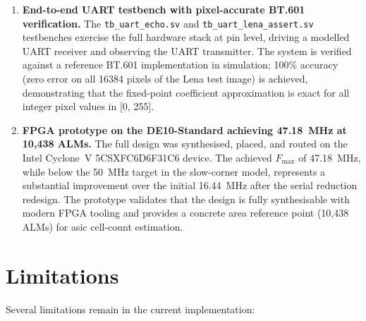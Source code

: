 \begin{enumerate}[label=\arabic*.]
  \item \textbf{End-to-end UART testbench with pixel-accurate BT.601 verification.}
    The \texttt{tb\_uart\_echo.sv} and \texttt{tb\_uart\_lena\_assert.sv} testbenches
    exercise the full hardware stack at pin level, driving a modelled UART receiver and
    observing the UART transmitter. The system is verified against a reference BT.601
    implementation in simulation; 100\% accuracy (zero error on all 16384 pixels of
    the Lena test image) is achieved, demonstrating that the fixed-point coefficient
    approximation is exact for all integer pixel values in [0, 255].

  \item \textbf{FPGA prototype on the DE10-Standard achieving 47.18~MHz at 10,438 ALMs.}
    The full design was synthesised, placed, and routed on the Intel Cyclone~V
    5CSXFC6D6F31C6 device. The achieved $F_\text{max}$ of 47.18~MHz, while below
    the 50~MHz target in the slow-corner model, represents a substantial improvement
    over the initial 16.44~MHz after the serial reduction redesign. The prototype
    validates that the design is fully synthesisable with modern FPGA tooling and
    provides a concrete area reference point (10,438 ALMs) for \gls{asic} cell-count
    estimation.

\end{enumerate}

\section{Limitations}
\label{sec:limitations_ch7}

Several limitations remain in the current implementation:

